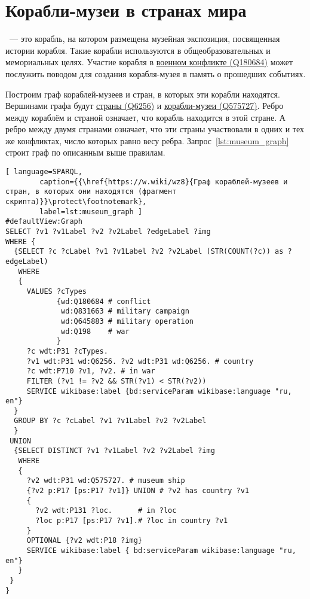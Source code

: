 \section{Корабли-музеи в странах мира}

~--- это корабль, на котором размещена музейная экспозиция, посвященная истории корабля. Такие корабли используются в общеобразовательных и мемориальных целях. Участие корабля в \href{https://www.wikidata.org/wiki/Q180684}{военном конфликте (Q180684)} может послужить поводом для создания корабля-музея в память о прошедших событиях. 

Построим граф кораблей-музеев и стран, в которых эти корабли находятся. 
Вершинами графа будут \href{https://www.wikidata.org/wiki/Q6256}{страны (Q6256)} и 
\href{https://www.wikidata.org/wiki/Q575727}{корабли-музеи (Q575727)}. 
Ребро между кораблём и страной означает, что корабль находится в этой стране. 
А ребро между двумя странами означает, 
что эти страны участвовали в одних и тех же конфликтах, число которых равно весу ребра. 
Запрос~\ref{lst:museum_graph} строит граф по описанным выше правилам.

\begin{lstlisting}[ language=SPARQL, 
        caption={{\href{https://w.wiki/wz8}{Граф кораблей-музеев и стран, в которых они находятся (фрагмент скрипта)}}\protect\footnotemark}, 
        label=lst:museum_graph ]
#defaultView:Graph    
SELECT ?v1 ?v1Label ?v2 ?v2Label ?edgeLabel ?img 
WHERE {
  {SELECT ?c ?cLabel ?v1 ?v1Label ?v2 ?v2Label (STR(COUNT(?c)) as ?edgeLabel) 
   WHERE
   {
     VALUES ?cTypes 
            {wd:Q180684 # conflict
             wd:Q831663 # military campaign
             wd:Q645883 # military operation
             wd:Q198    # war
            } 
     ?c wdt:P31 ?cTypes.
     ?v1 wdt:P31 wd:Q6256. ?v2 wdt:P31 wd:Q6256. # country
     ?c wdt:P710 ?v1, ?v2. # in war
     FILTER (?v1 != ?v2 && STR(?v1) < STR(?v2)) 
     SERVICE wikibase:label {bd:serviceParam wikibase:language "ru, en"}
  }
  GROUP BY ?c ?cLabel ?v1 ?v1Label ?v2 ?v2Label
  }
 UNION
  {SELECT DISTINCT ?v1 ?v1Label ?v2 ?v2Label ?img
   WHERE
   {
     ?v2 wdt:P31 wd:Q575727. # museum ship
     {?v2 p:P17 [ps:P17 ?v1]} UNION # ?v2 has country ?v1
     {
       ?v2 wdt:P131 ?loc.      # in ?loc
       ?loc p:P17 [ps:P17 ?v1].# ?loc in country ?v1
     } 
     OPTIONAL {?v2 wdt:P18 ?img}
     SERVICE wikibase:label { bd:serviceParam wikibase:language "ru, en"}
   }
 }
}
\end{lstlisting}


